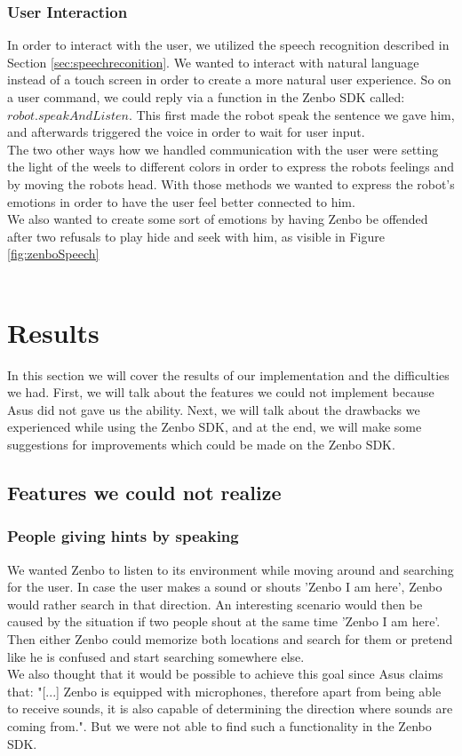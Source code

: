 \documentclass[conference]{IEEEtran}
\begin{document}
\subsubsection{User Interaction}
In order to interact with the user, we utilized the speech recognition described in Section \ref{sec:speechreconition}. We wanted to 
interact with natural language instead of a touch screen in order to create a more natural user experience.
So on a user command, we could reply via a function in the Zenbo SDK called: $robot.speakAndListen$. This first made the robot speak the sentence we 
gave him, and afterwards triggered the voice in order to wait for user input.\\
The two other ways how we handled communication with the user were setting the light of the weels to different colors in order to express the robots feelings and 
by moving the robots head. With those methods we wanted to express the robot's emotions in order to have the user feel better connected to him.\\
We also wanted to create some sort of emotions by having Zenbo be offended after two refusals to play hide and seek with him, as visible in Figure \ref{fig:zenboSpeech}
\\\\
\section{Results}
In this section we will cover the results of our implementation and the difficulties we had.
First, we will talk about the features we could not implement because Asus did not gave us the ability. 
Next, we will talk about the drawbacks we experienced while using the Zenbo SDK, and at the end, we will make some suggestions for improvements which could be made on the Zenbo SDK.
\subsection{Features we could not realize} \label{sec:drawbacks}
\subsubsection{People giving hints by speaking}
We wanted Zenbo to listen to its environment while moving around and searching for the user. In case the user makes a sound or shouts 'Zenbo I am here', 
Zenbo would rather search in that direction. An interesting scenario would then be caused by the situation if two people shout at the same time 'Zenbo I am here'.
Then either Zenbo could memorize both locations and search for them or pretend like he is confused and start searching somewhere else.\\
We also thought that it would be possible to achieve this goal since Asus claims that: 
"[...] Zenbo is equipped with microphones, therefore apart from being able to receive sounds, it is also capable of determining the direction where sounds are coming from.". \cite{b5}
But we were not able to find such a functionality in the Zenbo SDK.
\end{document}
